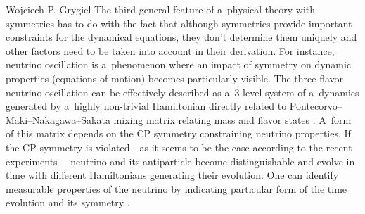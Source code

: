\begin{artengenv}{Wojciech P. Grygiel}
The third general feature of a~physical theory with symmetries has to do with the fact that although symmetries provide important constraints for the dynamical equations, they don't determine them uniquely and other factors need to be taken into account in their derivation. For instance, neutrino oscillation is a~phenomenon where an impact of symmetry on dynamic properties (equations of motion) becomes particularly visible. The three-flavor neutrino oscillation can be effectively described as a~3-level system of a~dynamics generated by a~highly non-trivial Hamiltonian directly related to Pontecorvo–Maki–Nakagawa–Sakata mixing matrix relating mass and flavor states 
\parencites[e.g][]{banerjee_quantum-information_2015}[][]{bilenky_neutrino_2016}. %
 A~form of this matrix depends on the CP symmetry constraining neutrino properties. If the CP symmetry is violated---as it seems to be the case according to the recent experiments 
\parencite[e.g][]{the_t2k_collaboration_constraint_2020}%
---neutrino and its antiparticle become distinguishable and evolve in time with different Hamiltonians generating their evolution. One can identify measurable properties of the neutrino by indicating particular form of the time evolution and its symmetry 
\parencite[e.g][]{richter_leggett-garg_2017}.%





\end{artengenv}
